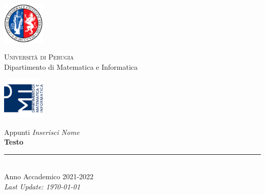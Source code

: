 
\thispagestyle{empty} %

\noindent %
\includegraphics[width=0.15\textwidth]{frontmatter/imgs/logoUniPg.jpg}
\begin{minipage}[b]{0.7\textwidth}
    \centering
    {\Large \textsc{Universit{\`a} di Perugia}}\\
    \vspace{0.4 em}
    {\large Dipartimento di Matematica e Informatica}
    \vspace{0.6 em}
\end{minipage}%
\includegraphics[width=0.15\textwidth]{frontmatter/imgs/logoDMI.jpg}

\vspace{8 em}

\begin{center}
    {\Huge Appunti \textit{Inserisci Nome}}\\
    \vspace{5 em}
    {\Huge \textbf{Testo}}\\

    \vfill

    \rule{380pt}{.4pt}\\
    \vspace{1.2 em}
    \large{Anno Accademico 2021-2022}\\ %
    \vspace{.9 em}
    \small{\textit{Last Update: \today{}}}
\end{center}

